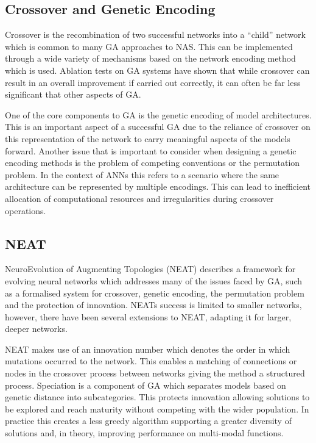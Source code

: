 \documentclass{article}
\begin{document}
	\subsection{Crossover and Genetic Encoding}

		Crossover is the recombination of two successful networks into a “child” network which is common to many GA approaches to NAS. \cite{3}\cite{24}\cite{5} This can be implemented through a wide variety of mechanisms based on the network encoding method which is used. Ablation tests on GA systems have shown that while crossover can result in an overall improvement if carried out correctly, it can often be far less significant that other aspects of GA. \cite{5}\cite{24}

		\par

		One of the core components to GA is the genetic encoding of model architectures. This is an important aspect of a successful GA due to the reliance of crossover on this representation of the network to carry meaningful aspects of the models forward. \cite{24} Another issue that is important to consider when designing a genetic encoding methods is the problem of competing conventions or the permutation problem\cite{38}\cite{24}. In the context of ANNs this refers to a scenario where the same architecture can be represented by multiple encodings. This can lead to inefficient allocation of computational resources and irregularities during crossover operations. \cite{24}


	\subsection{NEAT}


		NeuroEvolution of Augmenting Topologies (NEAT) \cite{24} describes a framework for evolving neural networks which addresses many of the issues faced by GA, such as a formalised system for crossover, genetic encoding, the permutation problem and the protection of innovation. NEATs success is limited to smaller networks, however, there have been several extensions to NEAT, adapting it for larger, deeper networks. \cite{44}\cite{25}

		NEAT makes use of an innovation number which denotes the order in which mutations occurred to the network. This enables a matching of connections or nodes in the crossover process between networks giving the method a structured process. Speciation is a component of GA which separates models based on genetic distance into subcategories. This protects innovation allowing solutions to be explored and reach maturity without competing with the wider population. In practice this creates a less greedy algorithm supporting a greater diversity of solutions and, in theory, improving performance on multi-modal functions. 
\end{document}
